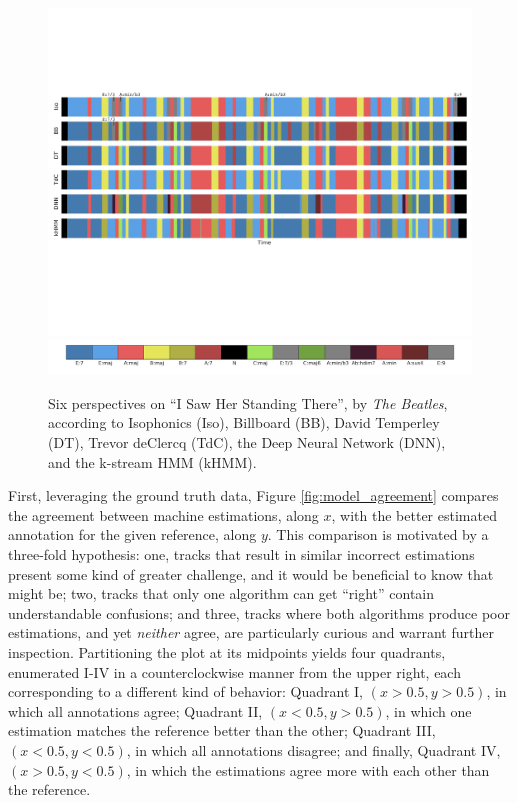 \documentclass{article}
\begin{document}
\begin{figure}[t!]
\centering
\includegraphics[width=\textwidth]{TROSSUK149E3AE03BD_annotations_mkup2}
\includegraphics[width=\textwidth]{TROSSUK149E3AE03BD_legend}
\caption{Six perspectives on ``I Saw Her Standing There'', by \emph{The Beatles}, according to Isophonics (Iso), Billboard (BB), David Temperley (DT), Trevor deClercq (TdC), the Deep Neural Network (DNN), and the k-stream HMM (kHMM).}
\label{fig:beatles}
\end{figure}


First, leveraging the ground truth data, Figure \ref{fig:model_agreement} compares the agreement between machine estimations, along $x$, with the better estimated annotation for the given reference, along $y$.
This comparison is motivated by a three-fold hypothesis:
one, tracks that result in similar incorrect estimations present some kind of greater challenge, and it would be beneficial to know that might be;
two, tracks that only one algorithm can get ``right'' contain understandable confusions;
and three, tracks where both algorithms produce poor estimations, and yet \emph{neither} agree, are particularly curious and warrant further inspection.
Partitioning the plot at its midpoints yields four quadrants, enumerated I-IV in a counterclockwise manner from the upper right, each corresponding to a different kind of behavior:
Quadrant I, $(x > 0.5, y > 0.5)$, in which all annotations agree;
Quadrant II, $(x < 0.5, y > 0.5)$, in which one estimation matches the reference better than the other;
Quadrant III, $(x < 0.5, y < 0.5)$, in which all annotations disagree;
and finally, Quadrant IV, $(x > 0.5, y < 0.5)$, in which the estimations agree more with each other than the reference.
\end{document}

